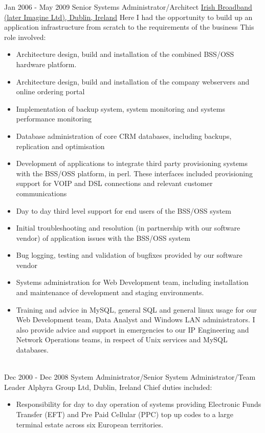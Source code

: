 \documentclass[a4paper]{tenseconds} %
\begin{document}
\begin{twenty} %
	\twentyitem
	{Jan 2006 -}
	{May 2009}
	{Senior Systems Administrator/Architect}
	{\href{https://www.imagine.ie/}{Irish Broadband (later Imagine Ltd), Dublin, Ireland}}
	{Here I had the opportunity to build up an application infrastructure from scratch to the requirements of the business This role involved:}
	{\begin{itemize}
		\item Architecture design, build and installation of the combined BSS/OSS hardware platform.
		\item Architecture design, build and installation of the company webservers and online ordering portal
		\item Implementation of backup system, system monitoring and systems performance monitoring
		\item Database administration of core CRM databases, including backups, replication and optimisation
		\item Development of applications to integrate third party provisioning systems with the BSS/OSS platform, in perl. These interfaces included provisioning support for VOIP and DSL connections and relevant customer communications
		\item Day to day third level support for end users of the BSS/OSS system
		\item Initial troubleshooting and resolution (in partnership with our software vendor) of application issues with the BSS/OSS system
		\item Bug logging, testing and validation of bugfixes provided by our software vendor
		\item Systems administration for Web Development team, including installation and maintenance of development and staging environments.
		\item Training and advice in MySQL, general SQL and general linux usage for our Web Development team, Data Analyst and Windows LAN administrators. I also provide advice and support in emergencies to our IP Engineering and Network Operations teams, in respect of Unix services and MySQL databases.
		\end{itemize}}
	\\
	\twentyitem
	{Dec 2000 -}
	{Dec 2008}
	{System Administrator/Senior System Administrator/Team Leader}
	{Alphyra Group Ltd, Dublin, Ireland}
	{Chief duties included:}
	{\begin{itemize}
		\item Responsibility for day to day operation of systems providing Electronic Funds Transfer (EFT) and Pre Paid Cellular (PPC) top up codes to a large terminal estate across six European territories.

\end{itemize}}
\end{twenty}
\end{document}
